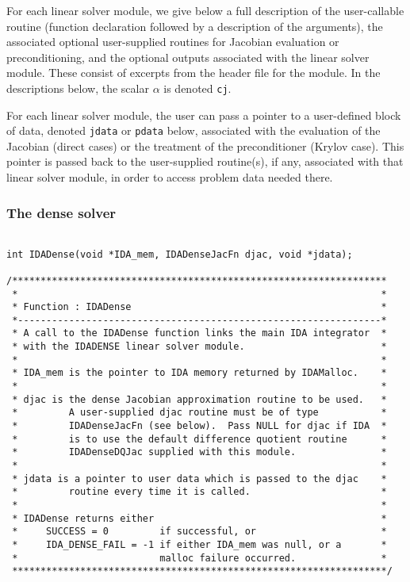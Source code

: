 \documentclass[11pt]{article}
\begin{document}
For each linear solver module, we give below a full description of the
user-callable routine (function declaration followed by a description
of the arguments), the associated optional user-supplied routines for
Jacobian evaluation or preconditioning, and the optional outputs
associated with the linear solver module.  These consist of excerpts
from the header file for the module.  In the descriptions below, the
scalar $\alpha$ is denoted {\tt cj}.

For each linear solver module, the user can pass a pointer to a
user-defined block of data, denoted {\tt jdata} or {\tt pdata} below,
associated with the evaluation of the Jacobian (direct cases) or the
treatment of the preconditioner (Krylov case).  This pointer is passed
back to the user-supplied routine(s), if any, associated with that
linear solver module, in order to access problem data needed there.


\subsubsection{The dense solver}

\small
\begin{verbatim}

int IDADense(void *IDA_mem, IDADenseJacFn djac, void *jdata);
 
/******************************************************************
 *                                                                *
 * Function : IDADense                                            *
 *----------------------------------------------------------------*
 * A call to the IDADense function links the main IDA integrator  *
 * with the IDADENSE linear solver module.                        *
 *                                                                *
 * IDA_mem is the pointer to IDA memory returned by IDAMalloc.    *
 *                                                                *
 * djac is the dense Jacobian approximation routine to be used.   *
 *         A user-supplied djac routine must be of type           *
 *         IDADenseJacFn (see below).  Pass NULL for djac if IDA  *
 *         is to use the default difference quotient routine      *
 *         IDADenseDQJac supplied with this module.               *
 *                                                                *
 * jdata is a pointer to user data which is passed to the djac    *
 *         routine every time it is called.                       *
 *                                                                *
 * IDADense returns either                                        *
 *     SUCCESS = 0         if successful, or                      *
 *     IDA_DENSE_FAIL = -1 if either IDA_mem was null, or a       *
 *                         malloc failure occurred.               *
 ******************************************************************/

\end{verbatim}
\normalsize
\end{document}
